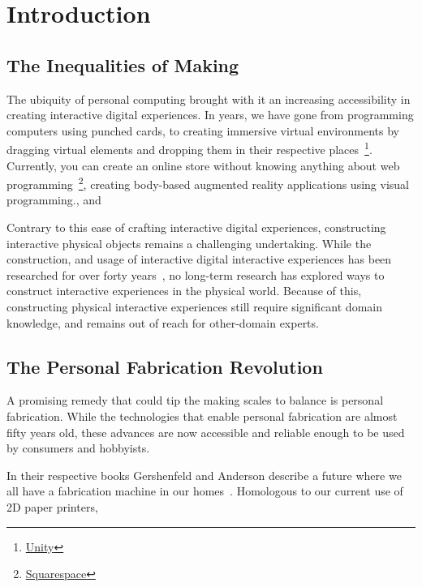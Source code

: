 \chapter{Introduction}
  \section{The Inequalities of Making}
    The ubiquity of personal computing brought with it an increasing
    accessibility in creating interactive digital experiences.  In 
    years, we have gone from programming computers using punched cards, to
    creating immersive virtual environments by dragging virtual elements and
    dropping them in their respective
    places~\footnote{\href{https://unity.com}{Unity}}.  Currently, you can
    create an online store without knowing anything about web
    programming~\footnote{\href{https://www.squarespace.com}{Squarespace}},
    creating body-based augmented reality applications using visual
    programming.\cite{Pohl:2020}, and 

    Contrary to this ease of crafting interactive digital experiences,
    constructing interactive physical objects remains a challenging
    undertaking. While the construction, and usage of interactive digital
    interactive experiences has been researched for over forty
    years~\cite{CHI, UIST}, no long-term research has explored ways to
    construct interactive experiences in the physical world. Because of this,
    constructing physical interactive experiences still require significant
    domain knowledge, and remains out of reach for other-domain experts.
   

  \section{The Personal Fabrication Revolution} \label{sec:fab-revolution}
    A promising remedy that could tip the making scales to balance is
    personal fabrication. While the technologies that enable personal
    fabrication  are almost fifty years old, these advances are
    now accessible and reliable enough to be used by consumers and hobbyists.

    In their respective books Gershenfeld and Anderson describe a future where
    we all have a fabrication machine in our homes~\cite{Gershenfeld:2005,
    Anderson:2012}.  Homologous to our current use of 2D paper printers,

